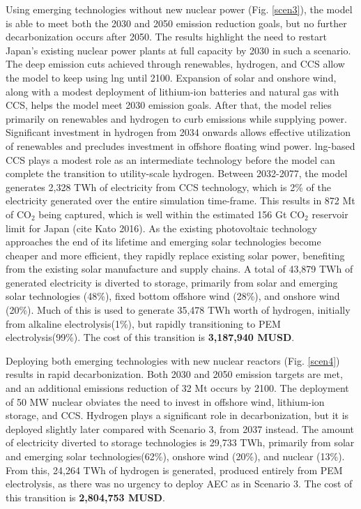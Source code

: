 Using emerging technologies without new nuclear power (Fig. \ref{scen3}), the model is able to meet both the 2030 and 2050 emission reduction goals, but no further decarbonization occurs after 2050. The results highlight the need to restart Japan's existing nuclear power plants at full capacity by 2030 in such a scenario. The deep emission cuts achieved through renewables, hydrogen, and \gls{CCS} allow the model to keep using \gls{lng} until 2100. Expansion of solar and onshore wind, along with a modest deployment of lithium-ion batteries and natural gas with \gls{CCS}, helps the model meet 2030 emission goals. After that, the model relies primarily on renewables and hydrogen to curb emissions while supplying power. Significant investment in hydrogen from 2034 onwards allows effective utilization of renewables and precludes investment in offshore floating wind power. \gls{lng}-based \gls{CCS} plays a modest role as an intermediate technology before the model can complete the transition to utility-scale hydrogen. Between 2032-2077, the model generates 2,328 TWh  of electricity from \gls{CCS} technology, which is 2\% of the electricity generated over the entire simulation time-frame. This results in 872 Mt of CO$_2$ being captured, which is well within the estimated 156 Gt CO$_2$ reservoir limit for Japan (cite Kato 2016). As the existing photovoltaic technology approaches the end of its lifetime and emerging solar technologies become cheaper and more efficient, they rapidly replace existing solar power, benefiting from the existing solar manufacture and supply chains. A total of 43,879 TWh of generated electricity is diverted to storage, primarily from solar and emerging solar technologies (48\%), fixed bottom offshore wind (28\%), and onshore wind (20\%). Much of this is used to generate 35,478 TWh worth of hydrogen, initially from alkaline electrolysis(1\%), but rapidly transitioning to PEM electrolysis(99\%). The cost of this transition is \textbf{3,187,940 MUSD}.

Deploying both emerging technologies with new nuclear reactors (Fig. \ref{scen4}) results in rapid decarbonization. Both 2030 and 2050 emission targets are met, and an additional emissions reduction of 32 Mt occurs by 2100. The deployment of 50 MW nuclear obviates the need to invest in offshore wind, lithium-ion storage, and \gls{CCS}. Hydrogen plays a significant role in decarbonization, but it is deployed slightly later compared with Scenario 3, from 2037 instead. The amount of electricity diverted to storage technologies is 29,733 TWh, primarily from solar and emerging solar technologies(62\%), onshore wind (20\%), and nuclear (13\%). From this, 24,264 TWh of hydrogen is generated, produced entirely from PEM electrolysis, as there was no urgency to deploy \gls{AEC} as in Scenario 3. The cost of this transition is \textbf{2,804,753 MUSD}.

